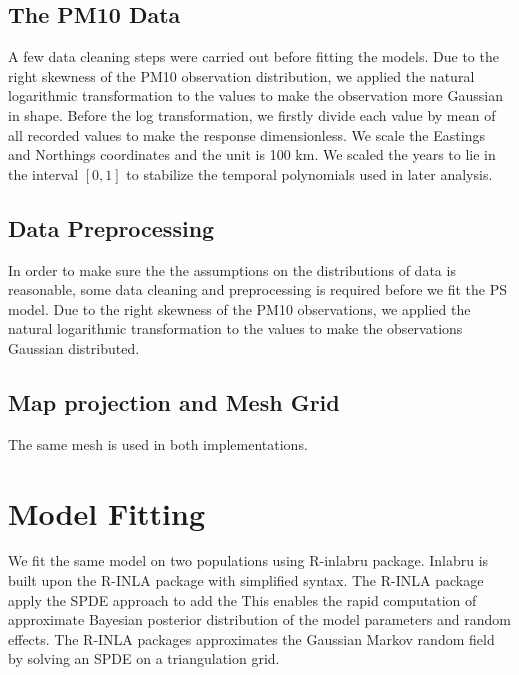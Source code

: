 \subsection{The PM10 Data}
A few data cleaning steps were carried out before fitting the models. Due to the right skewness of 
the PM10 observation distribution, we applied the natural logarithmic transformation to the values
to make the observation more Gaussian in shape. Before the log transformation, we firstly divide
each value by mean of all recorded values to make the response dimensionless.
We scale the Eastings and Northings coordinates and the unit is 100 km. We scaled the years to
lie in the interval $[0, 1]$ to stabilize the temporal polynomials used in later analysis.

\subsection{Data Preprocessing}
In order to make sure the the assumptions on the distributions of data is reasonable, some data
cleaning and preprocessing is required before we fit the PS model. Due to the right skewness of the
PM10 observations, we applied the natural logarithmic transformation to the values to make the 
observations Gaussian distributed. 

\subsection{Map projection and Mesh Grid}
The same mesh is used in both implementations. 


\section{Model Fitting}
We fit the same model on two populations using R-inlabru package. Inlabru is built upon the R-INLA 
package with simplified syntax. The R-INLA package apply the SPDE approach to add the
This enables the rapid computation of approximate Bayesian posterior distribution of the model 
parameters and random effects. The R-INLA packages approximates the Gaussian Markov random field by
solving an SPDE on a triangulation grid.
